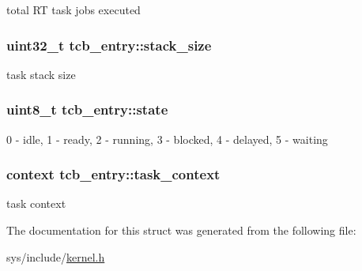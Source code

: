 total R\-T task jobs executed \hypertarget{structtcb__entry_a2174ff4c5cf178e9dc3d652c472b23dd}{
\subsubsection[{stack\-\_\-size}]{\setlength{\rightskip}{0pt plus 5cm}uint32\-\_\-t tcb\-\_\-entry\-::stack\-\_\-size}}\label{structtcb__entry_a2174ff4c5cf178e9dc3d652c472b23dd}
task stack size \hypertarget{structtcb__entry_a67f430ab50cb8ff9133e133fc240f3d7}{
\subsubsection[{state}]{\setlength{\rightskip}{0pt plus 5cm}uint8\-\_\-t tcb\-\_\-entry\-::state}}\label{structtcb__entry_a67f430ab50cb8ff9133e133fc240f3d7}
0 -\/ idle, 1 -\/ ready, 2 -\/ running, 3 -\/ blocked, 4 -\/ delayed, 5 -\/ waiting \hypertarget{structtcb__entry_a589e6c94b17a97df5d22edf504acfd42}{
\subsubsection[{task\-\_\-context}]{\setlength{\rightskip}{0pt plus 5cm}context tcb\-\_\-entry\-::task\-\_\-context}}\label{structtcb__entry_a589e6c94b17a97df5d22edf504acfd42}
task context 

The documentation for this struct was generated from the following file\-:\begin{DoxyCompactItemize}
\item 
sys/include/\hyperlink{kernel_8h}{kernel.\-h}\end{DoxyCompactItemize}
